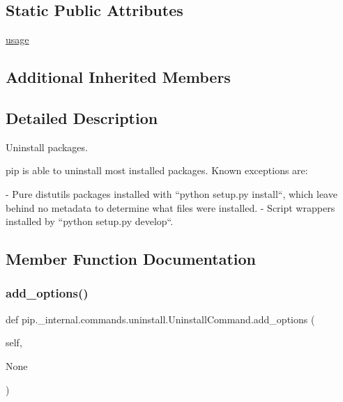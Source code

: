 \subsection*{Static Public Attributes}
\begin{DoxyCompactItemize}
\item 
\hyperlink{classpip_1_1__internal_1_1commands_1_1uninstall_1_1UninstallCommand_a37a186d7af3e12cca92059cd13e12225}{usage}
\end{DoxyCompactItemize}
\subsection*{Additional Inherited Members}


\subsection{Detailed Description}
\begin{DoxyVerb}Uninstall packages.

pip is able to uninstall most installed packages. Known exceptions are:

- Pure distutils packages installed with ``python setup.py install``, which
  leave behind no metadata to determine what files were installed.
- Script wrappers installed by ``python setup.py develop``.
\end{DoxyVerb}
 

\subsection{Member Function Documentation}
\mbox{\label{classpip_1_1__internal_1_1commands_1_1uninstall_1_1UninstallCommand_ababeb27770df5ac9d32df4aee3bb739e}} 
\subsubsection{\texorpdfstring{add\+\_\+options()}{add\_options()}}
{\footnotesize\ttfamily def pip.\+\_\+internal.\+commands.\+uninstall.\+Uninstall\+Command.\+add\+\_\+options (\begin{DoxyParamCaption}\item[{}]{self,  }\item[{}]{None }\end{DoxyParamCaption})}

